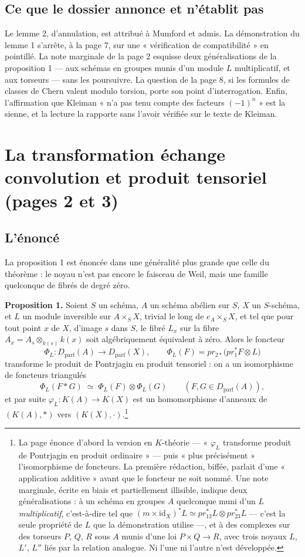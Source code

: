 \documentclass[11pt,a4paper]{article}
\begin{document}
\subsection*{Ce que le dossier annonce et n'établit pas}

Le lemme 2, d'annulation, est attribué à Mumford et admis. La démonstration
du lemme 1 s'arrête, à la page 7, sur une « vérification de compatibilité »
en pointillé. La note marginale de la page 2 esquisse deux généralisations de
la proposition 1 — aux schémas en groupes munis d'un module $L$
multiplicatif, et aux torseurs — sans les poursuivre. La question de la page
8, si les formules de classes de Chern valent modulo torsion, porte son point
d'interrogation. Enfin, l'affirmation que Kleiman « n'a pas tenu compte des
facteurs $(-1)^n$ » est la sienne, et la lecture la rapporte sans l'avoir
vérifiée sur le texte de Kleiman.

\section*{La transformation échange convolution et produit tensoriel (pages 2 et 3)}

\subsection*{L'énoncé}

La proposition 1 est énoncée dans une généralité plus grande que celle du
théorème : le noyau n'est pas encore le faisceau de Weil, mais une famille
quelconque de fibrés de degré zéro.

\textbf{Proposition 1.} Soient $S$ un schéma, $A$ un schéma abélien sur $S$,
$X$ un $S$-schéma, et $L$ un module inversible sur $A \times_S X$, trivial
le long de $e_A \times_S X$, et tel que pour tout point $x$ de $X$,
d'image $s$ dans $S$, le fibré $L_x$ sur la fibre $A_x = A_s \otimes_{k(s)}
k(x)$ soit algébriquement équivalent à zéro. Alors le foncteur
\[
  \Phi_L \colon D_{\mathrm{parf}}(A) \longrightarrow D_{\mathrm{parf}}(X),
  \qquad \Phi_L(F) = pr_{2*}\bigl(pr_1^{*}F \otimes L\bigr)
\]
transforme le produit de Pontrjagin en produit tensoriel : on a un
isomorphisme de foncteurs triangulés
\[
  \Phi_L(F * G) \;\simeq\; \Phi_L(F) \otimes \Phi_L(G)
  \qquad (F, G \in D_{\mathrm{parf}}(A)),
\]
et par suite $\varphi_L \colon K(A) \to K(X)$ est un homomorphisme d'anneaux
de $(K(A), *)$ vers $(K(X), \cdot)$.\footnote{La page énonce d'abord la
version en $K$-théorie — « $\varphi_L$ transforme produit de Pontrjagin en
produit ordinaire » — puis « plus précisément » l'isomorphisme de foncteurs.
La première rédaction, biffée, parlait d'une « application additive » avant
que le foncteur ne soit nommé. Une note marginale, écrite en biais et
partiellement illisible, indique deux généralisations : à un schéma en
groupes $A$ quelconque muni d'un $L$ \emph{multiplicatif}, c'est-à-dire tel
que $(m \times \mathrm{id}_X)^{*}L \simeq pr_{13}^{*}L \otimes pr_{23}^{*}L$ —
c'est la seule propriété de $L$ que la démonstration utilise —, et à des
complexes sur des torseurs $P$, $Q$, $R$ sous $A$ munis d'une loi
$P \times Q \to R$, avec trois noyaux $L$, $L'$, $L''$ liés par la relation
analogue. Ni l'une ni l'autre n'est développée.}
\end{document}
